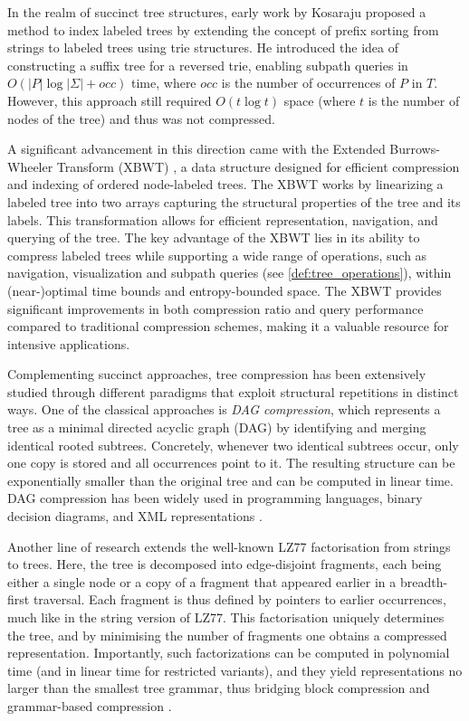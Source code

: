 In the realm of succinct tree structures, early work by Kosaraju \cite{kosaraju1989efficient} proposed a method to index labeled trees by extending the concept of prefix sorting from strings to labeled trees using trie structures. He introduced the idea of constructing a suffix tree for a reversed trie, enabling subpath queries in $O(|P|\log|\Sigma|+ occ)$ time, where $occ$ is the number of occurrences of $P$ in $T$. However, this approach still required $O(t \log t)$ space (where $t$ is the number of nodes of the tree) and thus was not compressed.

A significant advancement in this direction came with the Extended Burrows-Wheeler Transform (XBWT) \cite{ferragina2009compressing}, a data structure designed for efficient compression and indexing of ordered node-labeled trees. The XBWT works by linearizing a labeled tree into two arrays capturing the structural properties of the tree and its labels. This transformation allows for efficient representation, navigation, and querying of the tree. The key advantage of the XBWT lies in its ability to compress labeled trees while supporting a wide range of operations, such as navigation, visualization and subpath queries (see \cref{def:tree_operations}), within (near-)optimal time bounds and entropy-bounded space. The XBWT provides significant improvements in both compression ratio and query performance compared to traditional compression schemes, making it a valuable resource for intensive applications.

Complementing succinct approaches, tree compression has been extensively studied through different paradigms that exploit structural repetitions in distinct ways. One of the classical approaches is \emph{DAG compression}, which represents a tree as a minimal directed acyclic graph (DAG) by identifying and merging identical rooted subtrees. Concretely, whenever two identical subtrees occur, only one copy is stored and all occurrences point to it. The resulting structure can be exponentially smaller than the original tree and can be computed in linear time. DAG compression has been widely used in programming languages, binary decision diagrams, and XML representations \cite{billeTreeCompressionTop2015}.

Another line of research extends the well-known LZ77 factorisation from strings to trees. Here, the tree is decomposed into edge-disjoint fragments, each being either a single node or a copy of a fragment that appeared earlier in a breadth-first traversal. Each fragment is thus defined by pointers to earlier occurrences, much like in the string version of LZ77. This factorisation uniquely determines the tree, and by minimising the number of fragments one obtains a compressed representation. Importantly, such factorizations can be computed in polynomial time (and in linear time for restricted variants), and they yield representations no larger than the smallest tree grammar, thus bridging block compression and grammar-based compression \cite{gawrychowskiLZ77FactorisationTrees2016}.

